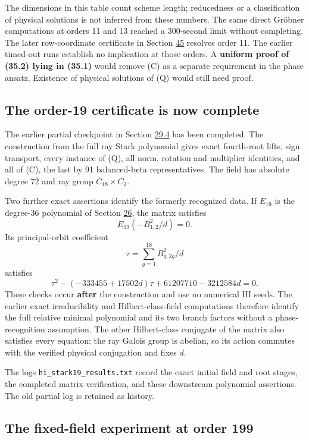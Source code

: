 \documentclass[11pt,reqno]{amsart}
\theoremstyle{plain}
\begin{document}
The dimensions in this table count scheme length; reducedness or a
classification of physical solutions is not inferred from these
numbers. The same direct Gr\"obner computations at orders 11 and 13
reached a 300-second limit without completing. The later row-coordinate
certificate in Section \hyperref[sec:45]{45} resolves order 11. The earlier timed-out runs establish no
implication at those orders. A \textbf{uniform proof of (35.2) lying in
(35.1)} would remove (C) as a separate requirement in the phase
ansatz. Existence of physical solutions of (Q) would still need proof.

\subsection{The order-19 certificate is now complete}\label{sec:35.2}

The earlier partial checkpoint in Section \hyperref[sec:29.4]{29.4} has been completed.
The construction from the full ray Stark polynomial gives exact
fourth-root lifts, sign transport, every instance of (Q), all norm,
rotation and multiplier identities, and all of (C), the last by
91 balanced-beta representatives. The field has absolute degree 72
and ray group \(C_{18}\times C_2\).

Two further exact assertions identify the formerly recognized data.
If \(E_{19}\) is the degree-36 polynomial of Section \hyperref[sec:26]{26}, the matrix
satisfies
\[
 E_{19}(-B_{1,2}^2/d)=0.
\]
Its principal-orbit coefficient
\[
 \tau=\sum_{g=1}^{18} B_{g,2g}^2/d
\]
satisfies
\[
 \tau^2-(-333455+17502d)\tau+61207710-3212584d=0.
\]
These checks occur \textbf{after} the construction and use no numerical
HI seeds. The earlier exact irreducibility and Hilbert-class-field
computations therefore identify the full relative minimal polynomial
and its two branch factors without a phase-recognition assumption.
The other Hilbert-class conjugate of the matrix also satisfies every
equation: the ray Galois group is abelian, so its action commutes with
the verified physical conjugation and fixes \(d\).

The logs \texttt{hi\_\allowbreak stark19\_\allowbreak results.txt} record the exact initial field and
root stages, the completed matrix verification, and these downstream
polynomial assertions. The old partial log is retained as history.

\subsection{The fixed-field experiment at order 199}\label{sec:35.3}
\end{document}
